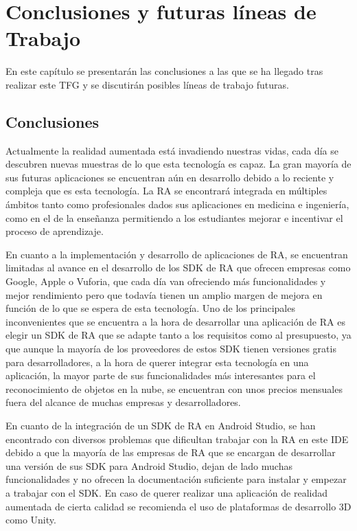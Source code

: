 %
%
%

\chapter{Conclusiones y futuras líneas de Trabajo} \label{chap:Conclusiones} 

En este capítulo se presentarán las conclusiones a las que se ha llegado tras realizar este TFG y se discutirán posibles líneas de trabajo futuras.

\section{Conclusiones}
 
Actualmente la realidad aumentada está invadiendo nuestras vidas, cada día se descubren nuevas muestras de lo que esta tecnología es capaz. La gran mayoría de sus futuras aplicaciones se encuentran aún en desarrollo debido a lo reciente y compleja que es esta tecnología. La RA se encontrará integrada en múltiples ámbitos tanto como profesionales dados sus aplicaciones en medicina e ingeniería, como en el de la enseñanza permitiendo a los estudiantes mejorar e incentivar el proceso de aprendizaje. 

En cuanto a la implementación y desarrollo de aplicaciones de RA, se encuentran limitadas al avance en el desarrollo de los SDK de RA que ofrecen empresas como Google, Apple o Vuforia, que cada día van ofreciendo más funcionalidades y mejor rendimiento pero que todavía tienen un amplio margen de mejora en función de lo que se espera de esta tecnología. Uno de los principales inconvenientes que se encuentra a la hora de desarrollar una aplicación de RA es elegir un SDK de RA que se adapte tanto a los requisitos como al presupuesto, ya que aunque la mayoría de los proveedores de estos SDK tienen versiones gratis para desarrolladores, a la hora de querer integrar esta tecnología en una aplicación,  la mayor parte de sus funcionalidades más interesantes para el reconocimiento de objetos en la nube, se encuentran con unos precios mensuales fuera del alcance de muchas empresas y desarrolladores.

En cuanto de la integración de un SDK de RA en Android Studio, se han encontrado con diversos problemas que dificultan trabajar con la RA en este IDE debido a que la mayoría de las empresas de RA que se encargan de desarrollar una versión de sus SDK para Android Studio, dejan de lado muchas funcionalidades y no ofrecen la documentación suficiente para instalar y empezar a trabajar con el SDK. En caso de querer realizar una aplicación de realidad aumentada de cierta calidad se recomienda el uso de plataformas de desarrollo 3D como Unity.



